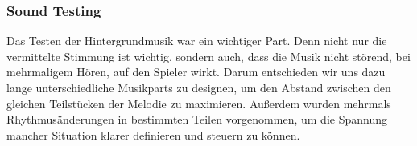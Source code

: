 \subsubsection{Sound Testing}\label{subsubsec:Sound-Testing}
Das Testen der Hintergrundmusik war ein wichtiger Part.
Denn nicht nur die vermittelte Stimmung ist wichtig, sondern auch, dass die Musik nicht störend, bei mehrmaligem Hören, auf den Spieler wirkt.
Darum entschieden wir uns dazu lange unterschiedliche Musikparts zu designen, um den Abstand zwischen den gleichen Teilstücken der Melodie zu maximieren.
Außerdem wurden mehrmals Rhythmusänderungen in bestimmten Teilen vorgenommen, um die Spannung mancher Situation klarer definieren und steuern zu können.

%

\renewcommand{\kapitelautor}{}
